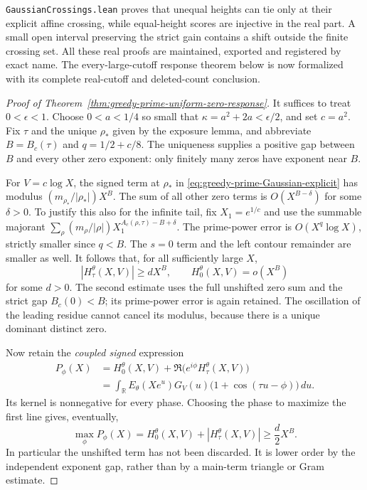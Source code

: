\documentclass[11pt]{article}
\theoremstyle{definition}
\begin{document}
\texttt{GaussianCrossings.lean} proves that unequal heights can tie
only at their explicit affine crossing, while equal-height scores
are injective in the real part. A small open interval preserving the
strict gain contains a shift outside the finite crossing set.
All these real proofs are maintained, exported and registered by
exact name. The every-large-cutoff response theorem below is now
formalized with its complete real-cutoff and deleted-count conclusion.

\begin{proof}[Proof of Theorem~\ref{thm:greedy-prime-uniform-zero-response}]
It suffices to treat $0<\epsilon<1$.
Choose $0<a<1/4$ so small that
$\kappa=a^2+2a<\epsilon/2$, and set $c=a^2$.
Fix $\tau$ and the unique $\rho_*$ given by the exposure lemma,
and abbreviate $B=B_c(\tau)$ and $q=1/2+c/8$.
The uniqueness supplies a positive gap between $B$ and every other
zero exponent: only finitely many zeros have exponent near $B$.

For $V=c\log X$, the signed term at $\rho_*$ in
\eqref{eq:greedy-prime-Gaussian-explicit} has modulus
$(m_{\rho_*}/|\rho_*|)X^B$.
The sum of all other zero terms is $O(X^{B-\delta})$
for some $\delta>0$.
To justify this also for the infinite tail, fix $X_1=e^{1/c}$ and use the
summable majorant
$\sum_\rho(m_\rho/|\rho|)X_1^{A_c(\rho,\tau)-B+\delta}$.
The prime-power error is $O(X^q\log X)$, strictly smaller since $q<B$.
The $s=0$ term and the left contour remainder are smaller as well.
It follows that, for all sufficiently large $X$,
\[
 |H_\tau^\theta(X,V)|\ge dX^B,\qquad
 H_0^\theta(X,V)=o(X^B)
\]
for some $d>0$.
The second estimate uses the full unshifted zero sum and the
strict gap $B_c(0)<B$; its prime-power error is again retained.
The oscillation of the leading residue cannot cancel its modulus,
because there is a unique dominant distinct zero.

Now retain the \emph{coupled signed} expression
\begin{equation}
 \begin{aligned}
 P_\phi(X)
   &=H_0^\theta(X,V)+
                  \Re\bigl(e^{i\phi}H_\tau^\theta(X,V)\bigr)\\
   &=\int_{\mathbb R}E_\theta(Xe^u)G_V(u)
                         \bigl(1+\cos(\tau u-\phi)\bigr)\,du .
 \end{aligned}
 \label{eq:greedy-prime-positive-Gaussian}
\end{equation}
Its kernel is nonnegative for every phase.
Choosing the phase to maximize the first line gives, eventually,
\[
 \max_\phi P_\phi(X)=H_0^\theta(X,V)+|H_\tau^\theta(X,V)|
                                      \ge\frac d2X^B .
\]
In particular the unshifted term has not been discarded.
It is lower order by the independent exponent gap, rather than by
a main-term triangle or Gram estimate.


\end{proof}
\end{document}

